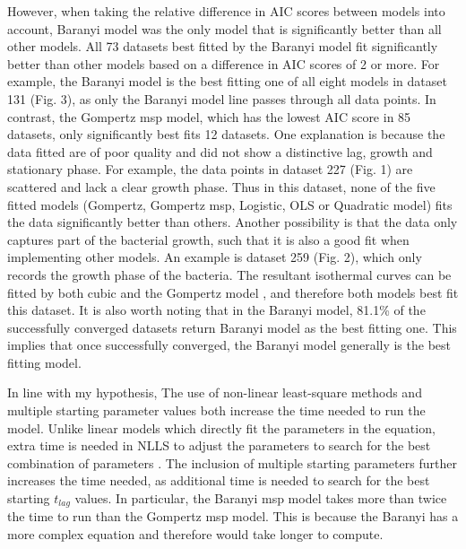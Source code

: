 \documentclass[11pt]{article}
\begin{document}
However, when taking the relative difference in AIC scores between models into account, Baranyi model was the only model that is significantly better than all other models. All 73 datasets best fitted by the Baranyi model fit significantly better than other models based on a difference in AIC scores of 2 or more. For example, the Baranyi model is the best fitting one of all eight models in dataset 131 (Fig. 3), as only the Baranyi model line passes through all data points. In contrast, the Gompertz msp model, which has the lowest AIC score in 85 datasets, only significantly best fits 12 datasets. One explanation is because the data fitted are of poor quality and did not show a distinctive lag, growth and stationary phase. For example, the data points in dataset 227 (Fig. 1) are scattered and lack a clear growth phase. Thus in this dataset, none of the five fitted models (Gompertz, Gompertz msp, Logistic, OLS or Quadratic model) fits the data significantly better than others. Another possibility is that the data only captures part of the bacterial growth, such that it is also a good fit when implementing other models. An example is dataset 259 (Fig. 2), which only records the growth phase of the bacteria. The resultant isothermal curves can be fitted by both cubic and the Gompertz model \cite{peleg_microbial_2011}, and therefore both models best fit this dataset. It is also worth noting that in the Baranyi model, 81.1\% of the successfully converged datasets return Baranyi model as the best fitting one. This implies that once successfully converged, the Baranyi model generally is the best fitting model. 
\vspace{\baselineskip}

In line with my hypothesis, The use of non-linear least-square methods and multiple starting parameter values both increase the time needed to run the model. Unlike linear models which directly fit the parameters in the equation, extra time is needed in NLLS to adjust the parameters to search for the best combination of parameters \cite{kallehauge_comparison_2016}. The inclusion of multiple starting parameters further increases the time needed, as additional time is needed to search for the best starting \(t_{lag}\) values. In particular, the Baranyi msp model takes more than twice the time to run than the Gompertz msp model. This is because the Baranyi has a more complex equation and therefore would take longer to compute. 
\vspace{\baselineskip}
\end{document}
